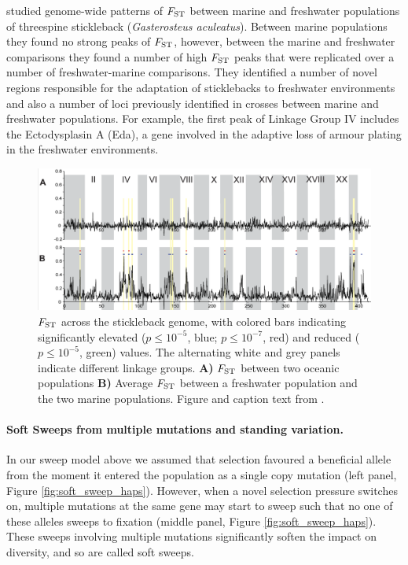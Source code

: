 \citet{hohenlohe2010population} studied genome-wide patterns of
$F_{\mathrm{ST}}$ between marine and freshwater populations of  threespine
stickleback ({\it Gasterosteus aculeatus}). 
Between marine populations they found no strong peaks of $F_{\mathrm{ST}}$,
however, between the marine and freshwater comparisons they found a
number of high $F_{\mathrm{ST}}$  peaks that were replicated over a number of
freshwater-marine comparisons. They identified a number of novel
regions responsible for the adaptation of sticklebacks to freshwater
environments and also a number of loci previously identified in crosses between marine and freshwater populations. For example, the first peak of Linkage
Group IV includes the Ectodysplasin A (Eda), a gene involved in the adaptive loss of armour plating in the freshwater environments.
\begin{figure}
\begin{center}
\includegraphics[width=0.9 \textwidth]{Journal_figs/recom_selection/Stickleback_FST/hohenlohe.png}
\end{center}
\caption{$F_{\mathrm{ST}}$ across the stickleback genome, with colored bars indicating
  significantly elevated ($p \leq 10^{−5}$, blue; $p \leq 10^{−7}$,
  red) and reduced ($p \leq 10^{−5}$, green) values. The alternating
  white and grey panels indicate different linkage groups. {\bf A)} $F_{\mathrm{ST}}$
  between two oceanic populations {\bf B)} Average $F_{\mathrm{ST}}$ between a
  freshwater population and the two marine populations. Figure and
  caption text from \citet{hohenlohe2010population}.} \label{fig:local_sweep_haps}
\end{figure}


\paragraph{Soft Sweeps from multiple mutations and standing variation.}
In our sweep model above we assumed that selection favoured a
beneficial allele from the moment it entered the population as a
single copy mutation  (left panel, Figure \ref{fig:soft_sweep_haps}). However, when a novel selection pressure
switches on, multiple mutations at the same gene
may start to sweep such that no one of these alleles sweeps
to fixation (middle panel, Figure \ref{fig:soft_sweep_haps}). These sweeps involving multiple mutations significantly
soften the impact on diversity, and so are called soft sweeps.

